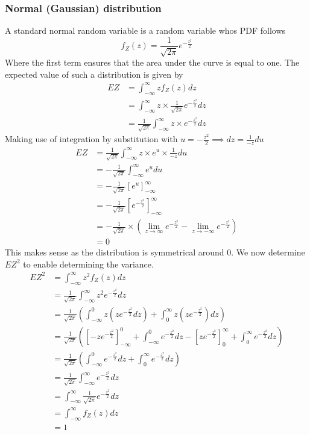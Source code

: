\subsubsection{Normal (Gaussian) distribution}
A standard normal random variable is a random variable whos PDF follows
\[
    f_{Z}(z)=\frac{1}{\sqrt{2\pi}}e^{-\frac{z^{2}}{2}}
\]
Where the first term ensures that the area under the curve is equal to one. The expected value of such a distribution is given by
\begin{align*}
    EZ&=\int_{-\infty}^{\infty}zf_{Z}(z)dz \\
      &=\int_{-\infty}^{\infty}z\times\frac{1}{\sqrt{2\pi}}e^{-\frac{z^{2}}{2}}dz \\
      &=\frac{1}{\sqrt{2\pi}}\int_{-\infty}^{\infty}z\times e^{-\frac{z^{2}}{2}}dz 
\end{align*}
Making use of integration by substitution with $u=-\frac{z^{2}}{2}\implies dz=\frac{1}{-z}du$
\begin{align*}
    EZ&=\frac{1}{\sqrt{2\pi}}\int_{-\infty}^{\infty}z\times e^{u}\times\frac{1}{-z}du \\
      &=-\frac{1}{\sqrt{2\pi}}\int_{-\infty}^{\infty}e^{u}du \\
      &=-\frac{1}{\sqrt{2\pi}}\left[e^{u}\right]_{-\infty}^{\infty} \\
      &=-\frac{1}{\sqrt{2\pi}}\left[e^{-\frac{z^{2}}{2}}\right]_{-\infty}^{\infty} \\
      &=-\frac{1}{\sqrt{2\pi}}\times\left(\lim_{z\rightarrow\infty}e^{-\frac{z^{2}}{2}}-\lim_{z\rightarrow-\infty}e^{-\frac{z^{2}}{2}}\right) \\
      &=0
\end{align*}
This makes sense as the distribution is symmetrical around 0. We now determine $EZ^{2}$ to enable determining the variance.
\begin{align*}
    EZ^{2}&=\int_{-\infty}^{\infty} z^{2}f_{Z}(z)dz \\ 
          &=\frac{1}{\sqrt{2\pi}}\int_{-\infty}^{\infty} z^{2}e^{-\frac{z^2}{2}}dz \\ 
          &=\frac{1}{\sqrt{2\pi}}\left(\int_{-\infty}^{0} z\left(ze^{-\frac{z^2}{2}}dz\right)+\int_{0}^{\infty} z\left(ze^{-\frac{z^2}{2}}\right)dz\right) \\ 
          &=\frac{1}{\sqrt{2\pi}}\left(\left[-ze^{-\frac{z^2}{2}}\right]_{-\infty}^{0}+\int_{-\infty}^{0}e^{-\frac{z^2}{2}}dz-\left[ze^{-\frac{z^2}{2}}\right]_{0}^{\infty}+\int_{0}^{\infty} e^{-\frac{z^2}{2}}dz\right) \\ 
          &=\frac{1}{\sqrt{2\pi}}\left(\int_{-\infty}^{0}e^{-\frac{z^2}{2}}dz+\int_{0}^{\infty} e^{-\frac{z^2}{2}}dz\right) \\
          &=\frac{1}{\sqrt{2\pi}}\int_{-\infty}^{\infty}e^{-\frac{z^2}{2}}dz \\ 
          &=\int_{-\infty}^{\infty}\frac{1}{\sqrt{2\pi}}e^{-\frac{z^2}{2}}dz \\ 
          &=\int_{-\infty}^{\infty}f_{Z}(z)dz \\ 
          &=1 
\end{align*}

